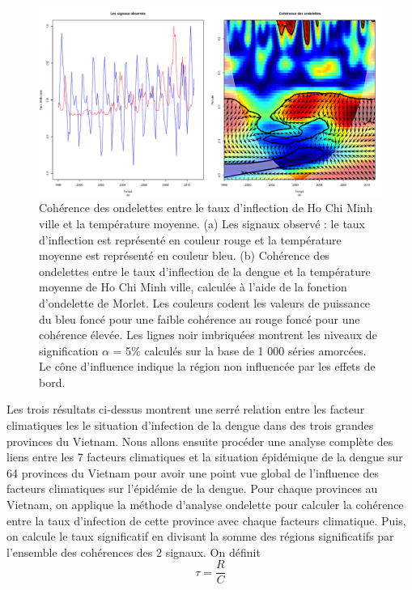 \begin{figure}[h]
\includegraphics[width = \linewidth]{../figures/chap4/Pic4_5.png}
\caption{Cohérence des ondelettes entre le taux d'inflection de Ho Chi Minh ville et la température moyenne. 
(a) Les signaux observé : le taux d'inflection est représenté en couleur rouge et la température moyenne est représenté en couleur bleu.
(b) Cohérence des ondelettes entre le taux d'inflection de la dengue et la température moyenne de Ho Chi Minh ville, calculée à l'aide de la fonction d'ondelette de Morlet. Les couleurs codent les valeurs de puissance du bleu foncé pour une faible cohérence au rouge foncé pour une cohérence élevée. Les lignes noir imbriquées montrent les niveaux de signification $\alpha$ = 5\% calculés sur la base de 1 000 séries amorcées. Le cône d'influence indique la région non influencée par les effets de bord.}
\label{Pic4_5}	
\end{figure}

Les trois résultats ci-dessus montrent une serré relation entre les facteur climatiques les le situation d'infection de la dengue dans des trois grandes provinces du Vietnam. Nous allons ensuite procéder une analyse complète des liens entre les 7 facteurs climatiques et la situation épidémique de la dengue sur 64 provinces du Vietnam pour avoir une point vue global de l'influence des facteurs climatiques sur l'épidémie de la dengue. Pour chaque provinces au Vietnam, on applique la méthode d'analyse ondelette pour calculer la cohérence entre la taux d'infection de cette province avec chaque facteurs climatique. Puis, on calcule 
le taux significatif en divisant la somme des régions significatifs par l'ensemble des cohérences des 2 signaux. On définit 
$$\tau = \frac{R}{C}$$

